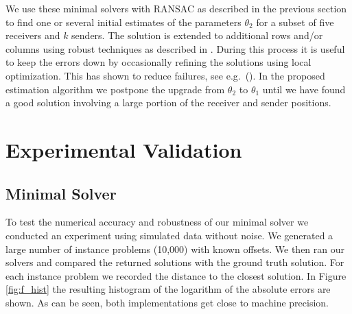 \documentclass[
]{book}
\begin{document}
We use these minimal solvers with RANSAC as described in the previous section to find one or several initial estimates of the parameters \(\theta_2\) for a subset of five receivers and \(k\) senders. The solution is extended to additional rows and/or columns using robust techniques as described in \cite{batstone2016robust}. During this process it is useful to keep the errors down by occasionally refining the solutions using local optimization. This has shown to reduce failures, see e.g.~(\cite{engels-stewenius-etal-06,klein2007parallel}).
In the proposed estimation algorithm we postpone the upgrade from \(\theta_2\) to \(\theta_1\) until we have found a good solution involving a large portion of the receiver and sender positions.
\vspace{-5pt}

\section{Experimental Validation}
\label{sec:exp}
\vspace{-5pt}
\subsection{Minimal Solver}
\vspace{-5pt}

To test the numerical accuracy and robustness of our minimal solver we conducted an experiment using simulated data without noise. We generated a large number of instance problems (10,000) with known offsets. We then ran our solvers and compared the returned solutions with the ground truth solution. For each instance problem we recorded the distance to the closest solution. In Figure \ref{fig:f_hist} the resulting histogram of the logarithm of the absolute errors are shown. As can be seen, both implementations get close to machine precision.
\end{document}
